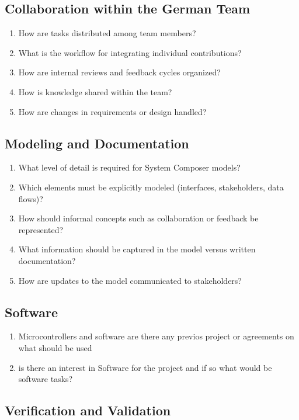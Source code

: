 	\subsection{Collaboration within the German Team}
	
	\begin{enumerate}
		\item How are tasks distributed among team members?
		\item What is the workflow for integrating individual contributions?
		\item How are internal reviews and feedback cycles organized?
		\item How is knowledge shared within the team?
		\item How are changes in requirements or design handled?
	\end{enumerate}
	
	\subsection{Modeling and Documentation}
	
	\begin{enumerate}
		\item What level of detail is required for System Composer models?
		\item Which elements must be explicitly modeled (interfaces, stakeholders, data flows)?
		\item How should informal concepts such as collaboration or feedback be represented?
		\item What information should be captured in the model versus written documentation?
		\item How are updates to the model communicated to stakeholders?
	\end{enumerate}
	\subsection{Software}
	\begin{enumerate}
		\item Microcontrollers and software are there any previos project or agreements on what should be used 
		\item is there an interest in Software for the project and if so what would be software tasks?
	\end{enumerate}
	\subsection{Verification and Validation}
	
